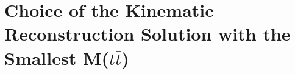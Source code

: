 \chapter{Choice of the Kinematic Reconstruction Solution with the Smallest M($t\bar{t}$)}\label{appendix:mtt}
